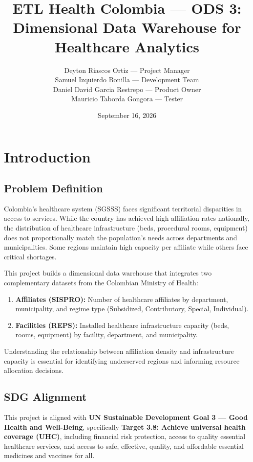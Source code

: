 \documentclass[12pt,a4paper]{article}
\title{
ETL Health Colombia --- ODS 3:\\
Dimensional Data Warehouse for\\
Healthcare Analytics
}
\author{
Deyton Riascos Ortiz --- Project Manager\\
Samuel Izquierdo Bonilla --- Development Team\\
Daniel David Garcia Restrepo --- Product Owner\\
Mauricio Taborda Gongora --- Tester
}
\date{September 16, 2026}
\begin{document}
\maketitle

\tableofcontents

\newpage

\section{Introduction}

\subsection{Problem Definition}

Colombia's healthcare system (SGSSS) faces significant territorial disparities in access to services. While the country has achieved high affiliation rates nationally, the distribution of healthcare infrastructure (beds, procedural rooms, equipment) does not proportionally match the population's needs across departments and municipalities. Some regions maintain high capacity per affiliate while others face critical shortages.

This project builds a dimensional data warehouse that integrates two complementary datasets from the Colombian Ministry of Health:

\begin{enumerate}[nosep]
    \item \textbf{Affiliates (SISPRO):} Number of healthcare affiliates by department, municipality, and regime type (Subsidized, Contributory, Special, Individual).
    \item \textbf{Facilities (REPS):} Installed healthcare infrastructure capacity (beds, rooms, equipment) by facility, department, and municipality.
\end{enumerate}

Understanding the relationship between affiliation density and infrastructure capacity is essential for identifying underserved regions and informing resource allocation decisions.

\subsection{SDG Alignment}

This project is aligned with \textbf{UN Sustainable Development Goal 3 --- Good Health and Well-Being}, specifically \textbf{Target 3.8: Achieve universal health coverage (UHC)}, including financial risk protection, access to quality essential healthcare services, and access to safe, effective, quality, and affordable essential medicines and vaccines for all.
\end{document}
